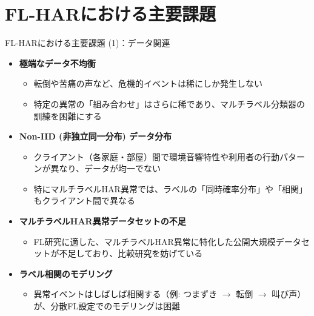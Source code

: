 \documentclass[unicode,12pt,aspectratio=169,dvipdfmx]{beamer}
\begin{document}
\section{FL-HARにおける主要課題}
\begin{frame}{FL-HARにおける主要課題 (1)：データ関連}
\begin{itemize}
    \item \textbf{極端なデータ不均衡}
    \begin{itemize}
        \item 転倒や苦痛の声など、危機的イベントは稀にしか発生しない
        \item 特定の異常の「組み合わせ」はさらに稀であり、マルチラベル分類器の訓練を困難にする
    \end{itemize}
    \item \textbf{Non-IID (非独立同一分布) データ分布}
    \begin{itemize}
        \item クライアント（各家庭・部屋）間で環境音響特性や利用者の行動パターンが異なり、データが均一でない
        \item 特にマルチラベルHAR異常では、ラベルの「同時確率分布」や「相関」もクライアント間で異なる
    \end{itemize}
    \item \textbf{マルチラベルHAR異常データセットの不足}
    \begin{itemize}
        \item FL研究に適した、マルチラベルHAR異常に特化した公開大規模データセットが不足しており、比較研究を妨げている
    \end{itemize}
    \item \textbf{ラベル相関のモデリング}
    \begin{itemize}
        \item 異常イベントはしばしば相関する（例: つまずき $\rightarrow$ 転倒 $\rightarrow$ 叫び声）が、分散FL設定でのモデリングは困難
    \end{itemize}
\end{itemize}
\end{frame}
\end{document}
